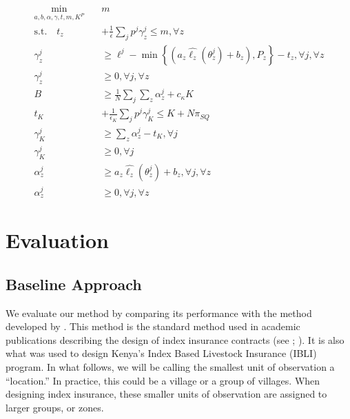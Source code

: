 \documentclass[11pt]{article}
\begin{document}
    \begin{align}
      \min_{a,b,\alpha,\gamma,t,m,K^P} \quad & m\\
      \text{s.t.} \quad t_z &+ \frac{1}{\epsilon} \sum_j p^j \gamma_z^j \leq m, \forall z\\
      \gamma_z^j &\geq \ell^j - \min\left\{(a_z\hat{\ell_z}(\theta_z^j) + b_z), P_z\right\} -t_z, \forall j, \forall z \\
      \gamma_z^j &\geq 0, \forall j, \forall z\\
      B &\geq \frac{1}{N} \sum_j \sum_z \alpha^j_z + c_{\kappa} K\\
      t_K &+ \frac{1}{\epsilon_K} \sum_j p^j \gamma_K^j \leq K+N\pi_{SQ}\\
      \gamma_K^j &\geq \sum_z \alpha^j_z -t_K, \forall j \\
      \gamma_K^j &\geq 0, \forall j\\
      \alpha^j_z &\geq a_z \hat{\ell_z}(\theta^j_z) + b_z, \forall j, \forall z\\
      \alpha^j_z &\geq 0, \forall j, \forall z
    \end{align}

\section{Evaluation}
  \subsection{Baseline Approach}\label{baseline}
   We evaluate our method by comparing its performance with the method developed by \cite{chantarat2013designing}. This method is the standard method used in academic publications describing the design of index insurance contracts (see \cite{flatnes2018improving}; \cite{jensen2019does}). It is also what was used to design Kenya's Index Based Livestock Insurance (IBLI) program. In what follows, we will be calling the smallest unit of observation a ``location.'' In practice, this could be a village or a group of villages. When designing index insurance, these smaller units of observation are assigned to larger groups, or zones. 
\end{document}
